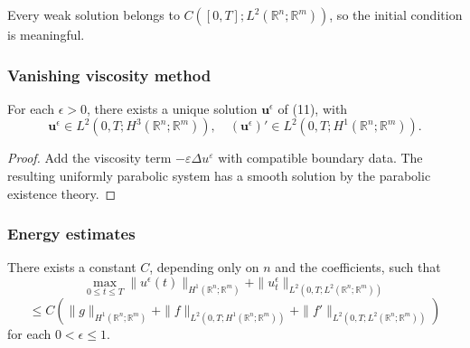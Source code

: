\begin{remark}
\label{rem:weak-solution-symmetric-hyperbolic-continuity}
Every weak solution belongs to $C([0,T];L^2(\mathbb R^n;\mathbb R^m))$, so the initial condition is meaningful.
\end{remark}

\subsubsection{Vanishing viscosity method}

\begin{theorem}
\label{thm:symmetric-hyperbolic-approximate-solutions}
For each $\epsilon > 0$, there exists a unique solution $\mathbf{u}^\epsilon$ of (11), with
\[
\mathbf{u}^\epsilon \in L^2(0,T; H^3(\mathbb{R}^n; \mathbb{R}^m)), \quad (\mathbf{u}^\epsilon)' \in L^2(0,T; H^1(\mathbb{R}^n; \mathbb{R}^m)).
\tag{12}
\]
\end{theorem}

\begin{proof}
\sketch Add the viscosity term $-\varepsilon\Delta u^{\varepsilon}$ with compatible boundary data. The resulting uniformly parabolic system has a smooth solution by the parabolic existence theory.
\end{proof}

\subsubsection{Energy estimates}

\begin{theorem}
\label{thm:symmetric-hyperbolic-energy-estimates}
There exists a constant $C$, depending only on $n$ and the coefficients, such that
\[
\max_{0 \leq t \leq T} \|u^\epsilon(t)\|_{H^1(\mathbb{R}^n;\mathbb{R}^m)} + \|u_t^\epsilon\|_{L^2(0,T;L^2(\mathbb{R}^n;\mathbb{R}^m))}
\]
\[
\leq C(\|g\|_{H^1(\mathbb{R}^n;\mathbb{R}^m)} + \|f\|_{L^2(0,T;H^1(\mathbb{R}^n;\mathbb{R}^m))} + \|f'\|_{L^2(0,T;L^2(\mathbb{R}^n;\mathbb{R}^m))})
\tag{17}
\]
for each $0 < \epsilon \leq 1$.
\end{theorem}

